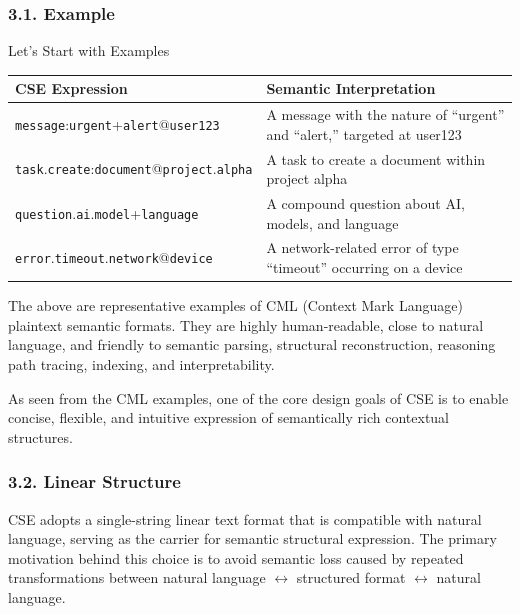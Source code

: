 \documentclass[conference]{IEEEtran}
\begin{document}
\subsubsection{3.1. Example}\label{31-example}

Let's Start with Examples

\begin{table}[htbp]
\centering
\begin{tabular}{ll}
\toprule
CSE Expression & Semantic Interpretation \\
\midrule
\texttt{message}:\texttt{urgent}+\texttt{alert}@\texttt{user123} &
A message with the nature of ``urgent'' and ``alert,'' targeted at user123 \\
\texttt{task}.\texttt{create}:\texttt{document}@\texttt{project}.\texttt{alpha} &
A task to create a document within project alpha \\
\texttt{question}.\texttt{ai}.\texttt{model}+\texttt{language} &
A compound question about AI, models, and language \\
\texttt{error}.\texttt{timeout}.\texttt{network}@\texttt{device} &
A network-related error of type ``timeout'' occurring on a device \\
\bottomrule
\end{tabular}
\end{table}


The above are representative examples of CML (Context Mark Language)
plaintext semantic formats. They are highly human-readable, close to
natural language, and friendly to semantic parsing, structural
reconstruction, reasoning path tracing, indexing, and interpretability.

As seen from the CML examples, one of the core design goals of CSE is to
enable concise, flexible, and intuitive expression of semantically rich
contextual structures.

\subsubsection{3.2. Linear Structure}\label{32-linear-structure}

CSE adopts a single-string linear text format that is compatible with
natural language, serving as the carrier for semantic structural
expression. The primary motivation behind this choice is to avoid
semantic loss caused by repeated transformations between natural
language $\leftrightarrow$ structured format $\leftrightarrow$ natural language.
\end{document}
